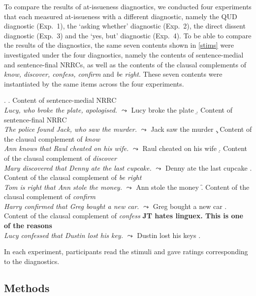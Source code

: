 \documentclass[12pt]{article}
\begin{document}
To compare the results of at-issueness diagnostics, we conducted four experiments that each measured at-issueness with a different diagnostic, namely the QUD diagnostic (Exp.~1), the `asking whether' diagnostic (Exp.~2), the direct dissent diagnostic (Exp.~3) and the `yes, but' diagnostic (Exp.~4). To be able to compare the results of the diagnostics, the same seven contents shown in \ref{stims} were investigated under the four diagnostics, namely the contents of sentence-medial and sentence-final NRRCs, as well as the contents of the clausal complements of \emph{know, discover, confess, confirm} and \emph{be right}. These seven contents were instantiated by the same items across the four experiments.
  
    \ex.\label{stims}
      \a.\label{stims.a} Content of sentence-medial NRRC \\
        \emph{Lucy, who broke the plate, apologised.} $\leadsto$ Lucy broke the plate
      \b.\label{stims.b} Content of sentence-final NRRC \\
      \emph{The police found Jack, who saw the murder.} $\leadsto$ Jack saw the murder
      \c.\label{stims.c} Content of the clausal complement of \emph{know} \\
      \emph{Ann knows that Raul cheated on his wife.} $\leadsto$ Raul cheated on his wife
       \d.\label{stims.d} Content of the clausal complement of \emph{discover} \\
      \emph{Mary discovered that Denny ate the last cupcake.} $\leadsto$ Denny ate the last cupcake
       \e.\label{stims.e} Content of the clausal complement of \emph{be right} \\
      \emph{Tom is right that Ann stole the money.} $\leadsto$ Ann stole the money
       \f.\label{stims.f} Content of the clausal complement of \emph{confirm} \\
      \emph{Harry confirmed that Greg bought a new car.} $\leadsto$ Greg bought a new car
       \z.\label{stims.g} Content of the clausal complement of \emph{confess} {\bf JT hates linguex. This is one of the reasons} \\
      \emph{Lucy confessed that Dustin lost his key.} $\leadsto$ Dustin lost his keys
    \z.
    
In each experiment, participants read the stimuli and gave ratings corresponding to the diagnostics.  


  \subsection{Methods}
  
\end{document}
